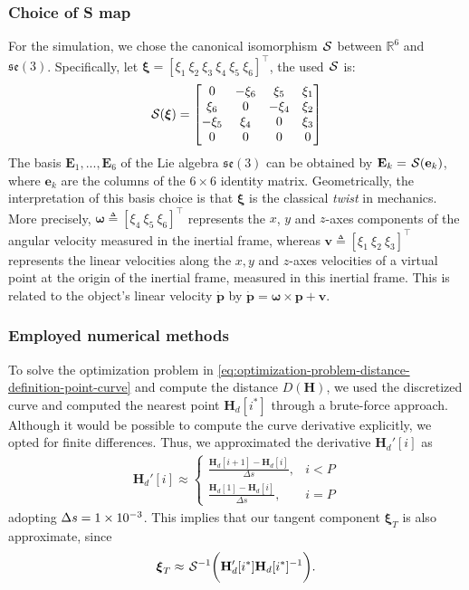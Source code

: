 \subsubsection{Choice of S map}
For the simulation, we chose the canonical isomorphism $\SL$ between $\mathbb{R}^6$ and $\mathfrak{se}(3)$. Specifically, let $\boldsymbol{\xi} = [\xi_1 \ \xi_2 \ \xi_3 \ \xi_4 \ \xi_5 \ \xi_6]^\top$, the used $\SL$ is:
\begin{align}
    \SL[\boldsymbol{\xi}] = \begin{bmatrix}
    0 & -\xi_6 & \xi_5 & \xi_1 \\
    \xi_6 & 0 & -\xi_4 & \xi_2 \\
    -\xi_5 & \xi_4 & 0 & \xi_3 \\
    0 & 0 & 0 & 0
    \end{bmatrix}
\end{align}
The basis $\mathbf{E}_1, ... ,\mathbf{E}_6$ of the Lie algebra $\mathfrak{se}(3)$ can be obtained by $\mathbf{E}_k = \SL[\mathbf{e}_k]$, where $\mathbf{e}_k$ are the columns of the $6 \times 6$ identity matrix. Geometrically, the interpretation of this basis choice is that $\boldsymbol{\xi}$ is the classical \emph{twist} in mechanics. More precisely, $\boldsymbol{\omega} \triangleq [\xi_4 \  \xi_5 \  \xi_6]^\top$ represents the $x$, $y$ and $z$-axes components of the angular  velocity  measured in the inertial frame, whereas $\mathbf{v} \triangleq [\xi_1 \  \xi_2 \  \xi_3]^\top$ represents the linear velocities along the $x, y$ and $z$-axes velocities of a virtual point at the origin of the inertial frame, measured in this inertial frame. This is related to the object's linear velocity $\dot{\mathbf{p}}$  by $\dot{\mathbf{p}} = \boldsymbol{\omega} \times \mathbf{p} + \mathbf{v}$.

\subsubsection{Employed numerical methods}
To solve the optimization problem in \eqref{eq:optimization-problem-distance-definition-point-curve} and compute the distance $D(\mathbf{H})$, we used the discretized curve and computed the nearest point $\mathbf{H}_d[i^*]$ through a brute-force approach. Although it would be possible to compute the curve derivative explicitly, we opted for finite differences. Thus, we approximated the derivative $\mathbf{H}_d'[i]$ as
\begin{align}
    \mathbf{H}_d'[i] \approx \begin{cases}
        \frac{\mathbf{H}_d[i+1] - \mathbf{H}_d[i]}{\Delta s}, &  i < P\\    
        \frac{\mathbf{H}_d[1] - \mathbf{H}_d[i]}{\Delta s}, &  i = P
    \end{cases}
\end{align}
adopting $\Delta s = \num{1E-3}$. This implies that our tangent component $\boldsymbol{\xi}_T$ is also approximate, since
\begin{align}
    \boldsymbol{\xi}_T \approx \invSL\biggl(\mathbf{H}_d'[i^*]\mathbf{H}_d[i^*]^{-1}\biggr).
\end{align}

